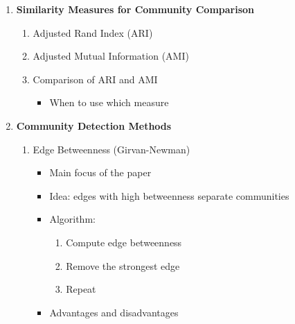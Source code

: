 \documentclass[12pt,a4paper]{article}
\begin{document}
\begin{enumerate}
\begin{enumerate}
  \item Degree Distribution
  \begin{itemize}
    \item Definition of degree distribution
    \item Random graph and scale-free graph
    \item Structural implications 
  \end{itemize}
\newpage
  \item Centrality Measures
  \begin{itemize}
    \item Degree centrality
    \item Betweenness centrality
  \end{itemize}
  \item Modularity
  \begin{itemize}
    \item Definition and intuition
    \end{itemize}
  \item Clustering Coefficient
  \begin{itemize}
    \item Definition and interpretation
  \end{itemize}
\end{enumerate}

\item \textbf{Similarity Measures for Community Comparison}
\begin{enumerate}
  \item Adjusted Rand Index (ARI)
  \item Adjusted Mutual Information (AMI)
  \item Comparison of ARI and AMI
  \begin{itemize}
    \item When to use which measure
  \end{itemize}
\end{enumerate}

\item \textbf{Community Detection Methods}
\begin{enumerate}

  \item Edge Betweenness (Girvan-Newman)

  \begin{itemize}
    \item Main focus of the paper
    \item Idea: edges with high betweenness separate communities
    \item Algorithm:
    \begin{enumerate}
      \item Compute edge betweenness
      \item Remove the strongest edge
      \item Repeat
    \end{enumerate}
    \item Advantages and disadvantages
  \end{itemize}


\end{enumerate}
\end{enumerate}
\end{document}
